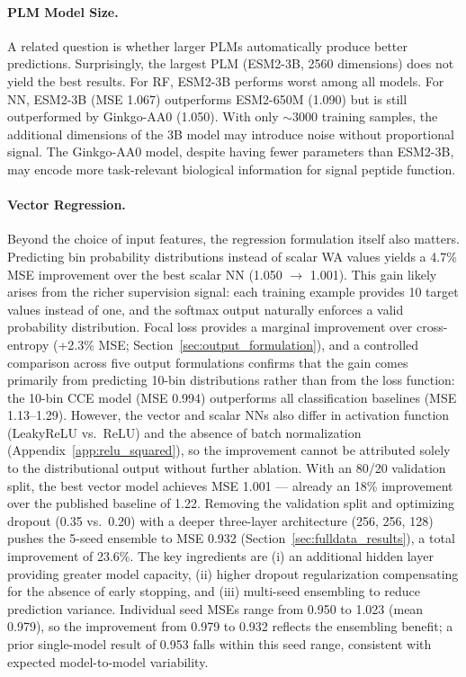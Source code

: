 \documentclass[12pt]{article}
\begin{document}
\paragraph{PLM Model Size.}
A related question is whether larger PLMs automatically produce better predictions.
Surprisingly, the largest PLM (ESM2-3B, 2560 dimensions) does not yield the best results.
For RF, ESM2-3B performs worst among all models.
For NN, ESM2-3B (MSE 1.067) outperforms ESM2-650M (1.090) but is still outperformed by Ginkgo-AA0 (1.050).
With only $\sim$3000 training samples, the additional dimensions of the 3B model may introduce noise without proportional signal.
The Ginkgo-AA0 model, despite having fewer parameters than ESM2-3B, may encode more task-relevant biological information for signal peptide function.

\paragraph{Vector Regression.}
Beyond the choice of input features, the regression formulation itself also matters.
Predicting bin probability distributions instead of scalar WA values yields a 4.7\% MSE improvement over the best scalar NN (1.050 $\to$ 1.001).
This gain likely arises from the richer supervision signal: each training example provides 10 target values instead of one, and the softmax output naturally enforces a valid probability distribution.
Focal loss provides a marginal improvement over cross-entropy (+2.3\% MSE; Section~\ref{sec:output_formulation}), and a controlled comparison across five output formulations confirms that the gain comes primarily from predicting 10-bin distributions rather than from the loss function: the 10-bin CCE model (MSE 0.994) outperforms all classification baselines (MSE 1.13--1.29).
However, the vector and scalar NNs also differ in activation function (LeakyReLU vs.\ ReLU) and the absence of batch normalization (Appendix~\ref{app:relu_squared}), so the improvement cannot be attributed solely to the distributional output without further ablation.
With an 80/20 validation split, the best vector model achieves MSE 1.001 --- already an 18\% improvement over the published baseline of 1.22.
Removing the validation split and optimizing dropout (0.35 vs.\ 0.20) with a deeper three-layer architecture (256, 256, 128) pushes the 5-seed ensemble to MSE 0.932 (Section~\ref{sec:fulldata_results}), a total improvement of 23.6\%.
The key ingredients are (i) an additional hidden layer providing greater model capacity, (ii) higher dropout regularization compensating for the absence of early stopping, and (iii) multi-seed ensembling to reduce prediction variance.
Individual seed MSEs range from 0.950 to 1.023 (mean 0.979), so the improvement from 0.979 to 0.932 reflects the ensembling benefit; a prior single-model result of 0.953 falls within this seed range, consistent with expected model-to-model variability.
\end{document}
